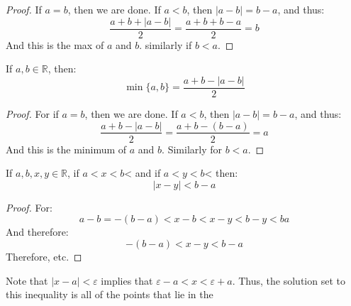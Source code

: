 \documentclass[crop=false,class=book,oneside]{standalone}
\begin{document}
            \begin{proof}
                If $a=b$, then we are done. If $a<b$, then
                $|a-b|=b-a$, and thus:
                \begin{equation}
                    \frac{a+b+|a-b|}{2}=\frac{a+b+b-a}{2}=b
                \end{equation}
                And this is the max of $a$ and $b$. similarly
                if $b<a$.
            \end{proof}
            \begin{theorem}
                If $a,b\in\mathbb{R}$, then:
                \begin{equation}
                    \min\{a,b\}=\frac{a+b-|a-b|}{2}
                \end{equation}
            \end{theorem}
            \begin{proof}
                For if $a=b$, then we are done. If
                $a<b$, then $|a-b|=b-a$, and thus:
                \begin{equation}
                    \frac{a+b-|a-b|}{2}=
                    \frac{a+b-(b-a)}{2}=a
                \end{equation}
                And this is the minimum of $a$ and $b$. Similarly
                for $b<a$.
            \end{proof}
            \begin{theorem}
                If $a,b,x,y\in\mathbb{R}$, if $a<x<b$< and if
                $a<y<b$< then:
                \begin{equation}
                    |x-y|<b-a
                \end{equation}
            \end{theorem}
            \begin{proof}
                For:
                \begin{equation}
                    a-b=\minus(b-a)<
                    x-b<x-y<b-y<ba
                \end{equation}
                And therefore:
                \begin{equation}
                    \minus(b-a)<x-y<b-a
                \end{equation}
                Therefore, etc.
            \end{proof}
            Note that $|x-a|<\varepsilon$ implies that
            $\varepsilon-a<x<\varepsilon+a$. Thus, the solution set
            to this inequality is all of the points that lie in the
\end{document}
